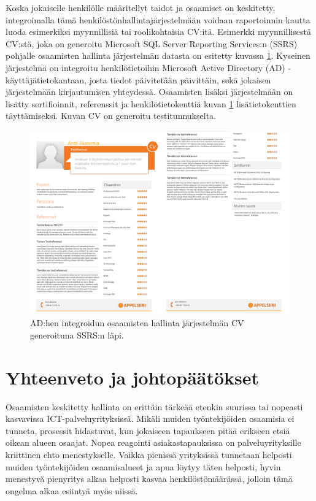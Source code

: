 \documentclass[a4paper,finnish,12pt]{article}
\begin{document}
Koska jokaiselle henkilölle määritellyt taidot ja osaamiset on keskitetty, integroimalla tämä henkilöstönhallintajärjestelmään voidaan raportoinnin kautta luoda esimerkiksi myynnillisiä tai roolikohtaisia CV:itä. Esimerkki myynnillisestä CV:stä, joka on generoitu Microsoft SQL Server Reporting Services:n (SSRS) pohjalle osaamisten hallinta järjestelmän datasta on esitetty kuvassa \ref{fig:sampleCV}. Kyseinen järjestelmä on integroitu henkilötietoihin Microsoft Active Directory (AD) -käyttäjätietokantaan, josta tiedot päivitetään päivittäin, sekä jokaisen järjestelmään kirjautumisen yhteydessä. Osaamisten lisäksi järjestelmään on lisätty sertifioinnit, referenssit ja henkilötietokenttiä kuvan \ref{fig:sampleCV} lisätietokenttien täyttämiseksi. Kuvan CV on generoitu testitunnukselta.

\begin{figure}
\centering
\includegraphics[width=1\textwidth]{Akatemia_sampleCV.png}
\caption{AD:hen integroidun osaamisten hallinta järjestelmän CV generoituna SSRS:n läpi.}
\label{fig:sampleCV}
\end{figure}

\clearpage

\section{Yhteenveto ja johtopäätökset}

Osaamisten keskitetty hallinta on erittäin tärkeää etenkin suurissa tai nopeasti kasvavissa ICT-palveluyrityksissä. Mikäli muiden työntekijöiden osaamisia ei tunneta, prosessit hidastuvat, kun jokaiseen tapaukseen pitää erikseen etsiä oikean alueen osaajat. Nopea reagointi asiakastapauksissa on palveluyrityksille kriittinen ehto menestykselle. Vaikka pienissä yrityksissä tunnetaan helposti muiden työntekijöiden osaamisalueet ja apua löytyy täten helposti, hyvin menestyvä pienyritys alkaa helposti kasvaa henkilöstömäärässä, jolloin tämä ongelma alkaa esiintyä myös niissä.
\end{document}
